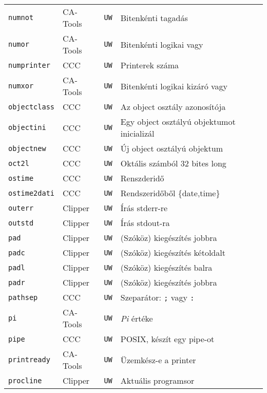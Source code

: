 \begin{tabular}{|l|l|l|l|}
\verb!numnot!                      & CA-Tools &  {\tt UW} & Bitenkénti tagadás\\
\verb!numor!                       & CA-Tools &  {\tt UW} & Bitenkénti logikai vagy\\
\verb!numprinter!                  & CCC      &  {\tt UW} & Printerek száma\\   
\verb!numxor!                      & CA-Tools &  {\tt UW} & Bitenkénti logikai kizáró vagy\\
\verb!objectclass!                 & CCC      &  {\tt UW} & Az object osztály azonosítója\\
\verb!objectini!                   & CCC      &  {\tt UW} & Egy object osztályú objektumot inicializál\\
\verb!objectnew!                   & CCC      &  {\tt UW} & Új object osztályú objektum\\
\verb!oct2l!                       & CCC      &  {\tt UW} & Oktális számból 32 bites long\\
\verb!ostime!                      & CCC      &  {\tt UW} & Renszderidő\\
\verb!ostime2dati!                 & CCC      &  {\tt UW} & Rendszeridőből \{date,time\}\\
\verb!outerr!                      & Clipper  &  {\tt UW} & Írás stderr-re\\
\verb!outstd!                      & Clipper  &  {\tt UW} & Írás stdout-ra\\
\verb!pad!                         & Clipper  &  {\tt UW} & (Szóköz) kiegészítés jobbra\\ 
\verb!padc!                        & Clipper  &  {\tt UW} & (Szóköz) kiegészítés kétoldalt\\
\verb!padl!                        & Clipper  &  {\tt UW} & (Szóköz) kiegészítés balra\\ 
\verb!padr!                        & Clipper  &  {\tt UW} & (Szóköz) kiegészítés jobbra\\
\verb!pathsep!                     & CCC      &  {\tt UW} & Szeparátor: \verb!;! vagy \verb!:!\\
\verb!pi!                          & CA-Tools &  {\tt UW} & {\em Pi\/} értéke\\
\verb!pipe!                        & CCC      &  {\tt UW} & POSIX, készít egy pipe-ot\\   
\verb!printready!                  & CA-Tools &  {\tt UW} & Üzemkész-e a printer\\
\verb!procline!                    & Clipper  &  {\tt UW} & Aktuális programsor\\

\end{tabular}
